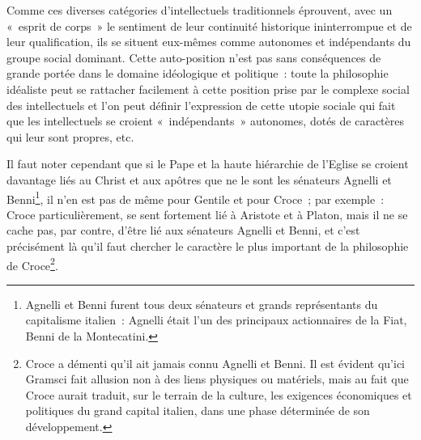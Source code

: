 \documentclass[french,twoside]{book} %
\begin{document}
\begin{enumerate}[itemsep=\baselineskip,]
 Comme ces diverses catégories d’intellectuels traditionnels éprouvent, avec un « esprit de corps » le sentiment de leur continuité historique ininterrompue et de leur qualification, ils se situent eux-mêmes comme autonomes et indépendants du groupe social dominant. Cette auto-position n’est pas sans conséquences de grande portée dans le domaine idéologique et politique : toute la philosophie idéaliste peut se rattacher facilement à cette position prise par le complexe social des intellectuels et l’on peut définir l’expression de cette utopie sociale qui fait que les intellectuels se croient « indépendants » autonomes, dotés de caractères qui leur sont propres, etc.\par
 Il faut noter cependant que si le Pape et la haute hiérarchie de l’Eglise se croient davantage liés au Christ et aux apôtres que ne le sont les sénateurs Agnelli et Benni\footnote{Agnelli et Benni furent tous deux sénateurs et grands représentants du capitalisme italien : Agnelli était l’un des principaux actionnaires de la Fiat, Benni de la Montecatini.}, il n’en est pas de même pour Gentile et pour Croce ; par exemple : Croce particulièrement, se sent fortement lié à Aristote et à Platon, mais il ne se cache pas, par contre, d’être lié aux sénateurs Agnelli et Benni, et c’est précisément là qu’il faut chercher le caractère le plus important de la philosophie de Croce\footnote{Croce a démenti qu’il ait jamais connu Agnelli et Benni. Il est évident qu’ici Gramsci fait allusion non à des liens physiques ou matériels, mais au fait que Croce aurait traduit, sur le terrain de la culture, les exigences économiques et politiques du grand capital italien, dans une phase déterminée de son développement.}.
 
\end{enumerate}
\end{document}
